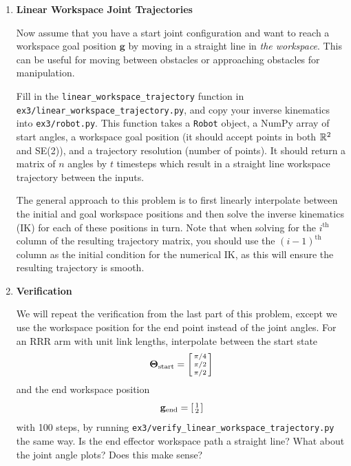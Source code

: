 \documentclass{16384_doc}
\begin{document}
\begin{questions}
\begin{enumerate} [label=\alph*.]
\begin{verbatim}
    cd ex3
    python verify_linear_joint_trajectory.py
    cd ..
\end{verbatim}

        The joint angle plots should be straight lines, as this is a linear
        interpolation in joint space. What does the end effector path look like?
        Does this make sense?

        \textbf{Note: You do not have to submit anything for this part; however,
        you should use this to detect any problems with your code before
        continuing!}

        \item \text{[15 points]} \textbf{Linear Workspace Joint Trajectories}

        Now assume that you have a start joint configuration and want to reach a
        workspace goal position $\mathbf{g}$ by moving in a straight line in
        \emph{the workspace}. This can be useful for moving between obstacles or
        approaching obstacles for manipulation.

        Fill in the \verb!linear_workspace_trajectory! function in
        \verb!ex3/linear_workspace_trajectory.py!, and copy your inverse
        kinematics into \verb!ex3/robot.py!. This function takes a \verb!Robot!
        object, a NumPy array of start angles, a workspace goal position (it
        should accept points in both $\RR[2]$ and SE(2)), and a trajectory
        resolution (number of points). It should return a matrix of $n$ angles by
        $t$ timesteps which result in a straight line workspace trajectory
        between the inputs.

        The general approach to this problem is to first linearly interpolate
        between the initial and goal workspace positions and then solve the
        inverse kinematics (IK) for each of these positions in turn. Note that
        when solving for the $i^{\text{th}}$ column of the resulting trajectory
        matrix, you should use the $(i-1)^{\text{th}}$ column as the initial
        condition for the numerical IK, as this will ensure the resulting
        trajectory is smooth.

        \item \textbf{Verification}

        We will repeat the verification from the last part of this problem,
        except we use the workspace position for the end point instead of the
        joint angles. For an RRR arm with unit link lengths, interpolate between
        the start state
        \[
        \mathbf{\Theta}_{\text{start}} = \left[\begin{smallmatrix}\pi/4\\\pi/2\\\pi/2\end{smallmatrix}\right]
        \]
        and the end workspace position
        \[
        \mathbf{g}_{\text{end}} = \left[\begin{smallmatrix}1\\2\end{smallmatrix}\right]
        \]
        with 100 steps, by running
        \verb!ex3/verify_linear_workspace_trajectory.py! the same way. Is the end
        effector workspace path a straight line? What about the joint angle
        plots? Does this make sense?


\end{enumerate}
\end{questions}
\end{document}
